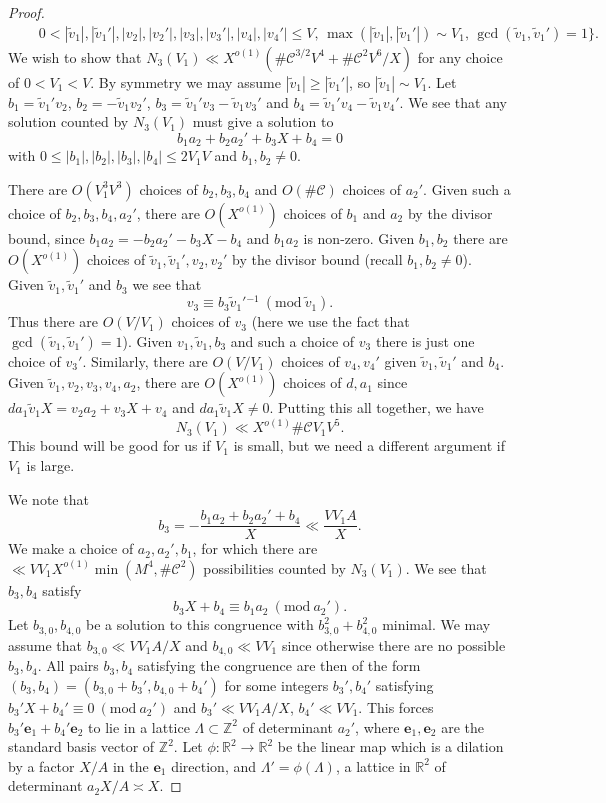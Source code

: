 \documentclass[10pt]{amsart}
\theoremstyle{plain}
\numberwithin{sblmm}{thrm}
\numberwithin{equation}{section}
\newcommand{\Mod}[1]{\ (\mathrm{mod}\ #1)}
\begin{document}
\begin{proof}
\begin{align*}
&\quad 0<|\tilde{v}_1|,|\tilde{v}_1'|,|v_2|,|v_2'|,|v_3|,|v_3'|,|v_4|,|v_4'|\le V,\,\max(|\tilde{v}_1|,|\tilde{v}_1'|)\sim V_1,\,\gcd(\tilde{v}_1,\tilde{v}_1')=1\Bigr\}.
\end{align*}
We wish to show that $N_3(V_1)\ll X^{o(1)}(\#\mathcal{C}^{3/2}V^4+\#\mathcal{C}^2V^6/X)$ for any choice of $0<V_1<V$. By symmetry we may assume $|\tilde{v}_1|\ge |\tilde{v}_1'|$, so $|\tilde{v}_1|\sim V_1$. Let $b_1=\tilde{v}_1'v_2$, $b_2=-\tilde{v}_1v_2'$, $b_3=\tilde{v}_1'v_3-\tilde{v}_1v_3'$ and $b_4=\tilde{v}_1'v_4-\tilde{v}_1v_4'$. We see that any solution counted by $N_3(V_1)$ must give a solution to
\[
b_1a_2+b_2a_2'+b_3X+b_4=0
\]
with $0\le|b_1|,|b_2|,|b_3|,|b_4|\le 2V_1V$ and $b_1,b_2\ne 0$.

There are $O(V_1^3V^3)$ choices of $b_2,b_3,b_4$ and  $O(\#\mathcal{C})$ choices of $a_2'$. Given such a choice of $b_2,b_3,b_4,a_2'$, there are $O(X^{o(1)})$ choices of $b_1$ and $a_2$ by the divisor bound, since $b_1a_2=-b_2a_2'-b_3X-b_4$ and $b_1a_2$ is non-zero. Given $b_1,b_2$ there are $O(X^{o(1)})$ choices of $\tilde{v}_1,\tilde{v}_1',v_2,v_2'$ by the divisor bound (recall $b_1,b_2\ne 0$). Given $\tilde{v}_1,\tilde{v}_1'$ and $b_3$ we see that
\[
v_3\equiv b_3 \tilde{v}_1'{}^{-1}\Mod{\tilde{v}_1}.
\]
Thus there are $O(V/V_1)$ choices of $v_3$ (here we use the fact that $\gcd(\tilde{v}_1,\tilde{v}_1')=1$). Given $v_1,\tilde{v}_1,b_3$ and such a choice of $v_3$ there is just one choice of $v_3'$. Similarly, there are $O(V/V_1)$ choices of $v_4,v_4'$ given $\tilde{v}_1,\tilde{v}_1'$ and $b_4$. Given $\tilde{v}_1,v_2,v_3,v_4,a_2$, there are $O(X^{o(1)})$ choices of $d,a_1$ since $d a_1\tilde{v}_1X=v_2a_2+v_3 X+v_4$ and $d a_1 \tilde{v}_1 X\ne 0$. Putting this all together, we have 
\begin{equation}
N_3(V_1)\ll X^{o(1)}\#\mathcal{C} V_1 V^5.
\label{eq:V1Small}
\end{equation}
 This bound will be good for us if $V_1$ is small, but we need a different argument if $V_1$ is large.

We note that
\[
b_3=-\frac{b_1a_2+b_2a_2'+b_4}{X}\ll \frac{V V_1 A}{X}.
\]
We make a choice of $a_2,a_2',b_1$, for which there are $\ll V V_1 X^{o(1)}\min(M^4,\#\mathcal{C}^2)$ possibilities counted by $N_3(V_1)$. We see that $b_3,b_4$ satisfy
\[
b_3 X+b_4\equiv b_1a_2\Mod{a_2'}.
\]
Let $b_{3,0},b_{4,0}$ be a solution to this congruence with $b_{3,0}^2+b_{4,0}^2$ minimal. We may assume that $b_{3,0}\ll VV_1A/X$ and $b_{4,0}\ll VV_1$ since otherwise there are no possible $b_3,b_4$. All pairs $b_3,b_4$ satisfying the congruence are then of the form  $(b_3,b_4)=(b_{3,0}+b_3',b_{4,0}+b_4')$ for some integers $b_3',b_4'$ satisfying $b_3'X+b_4'\equiv 0\Mod{a_2'}$ and $b_3'\ll V V_1A/X$, $b_4'\ll V V_1$. This forces $b_3'\mathbf{e}_1+b_4'\mathbf{e}_2$ to lie in a lattice $\Lambda\subset\mathbb{Z}^2$ of determinant $a_2'$, where $\mathbf{e}_1,\mathbf{e}_2$ are the standard basis vector of $\mathbb{Z}^2$. Let $\phi:\mathbb{R}^2\rightarrow\mathbb{R}^2$ be the linear map which is a dilation by a factor $X/A$ in the $\mathbf{e}_1$ direction, and $\Lambda'=\phi(\Lambda)$, a lattice in $\mathbb{R}^2$ of determinant $a_2X/A\asymp X$. 


\end{proof}
\end{document}
